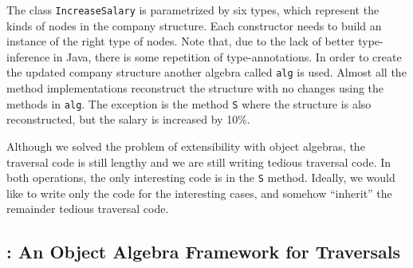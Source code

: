 The class \lstinline{IncreaseSalary} is parametrized by six types,
which represent the kinds of nodes in the company structure. Each
constructor needs to build an instance of the right type of nodes.
Note that, due to the lack of better type-inference in Java, there is
some repetition of type-annotations. In order to create the updated
company structure another algebra called \lstinline{alg} is used.
Almost all the method implementations reconstruct the structure with
no changes using the methods in \lstinline{alg}. The exception is the
method \lstinline{S} where the structure is also reconstructed, but
the salary is increased by 10\%.



Although we solved the problem of extensibility with object
algebras, the traversal code is still lengthy and we are still writing
tedious traversal code. In both operations, the only interesting code
is in the \lstinline{S} method. Ideally, we would like to write only
the code for the interesting cases, and somehow ``inherit'' the
remainder tedious traversal code.


\subsection{\Name: An Object Algebra Framework for Traversals}

